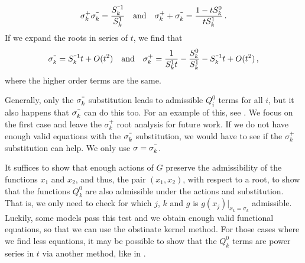\begin{align}
	\sigma_k^+ \sigma_k^{\um} = \frac{S_k^{\um 1}}{S_k^1} \qandq \sigma_k^+  + \sigma_k^{\um} = \frac{1-t S_k^0}{t S_k^1}\,.
\end{align}
If we expand the roots in series of $t$, we find that
\begin{align}
	\sigma_k^{\um} = S_k^{\um1} t + O(t^2) \qandq \sigma_k^+ = \frac{1}{S_k^1 t}-\frac{S_k^0}{S_k^1}-S_k^{\um 1} t + O(t^2)\,,
\end{align}
where the higher order terms are the same.

Generally, only the $\sigma_k^{\um}$ substitution leads to admissible $Q_i^0$ terms for all $i$, but it also happens that $\sigma_k^{\um}$ can do this too. For an example of this, see \cite[p.~11]{tabbara2014exact}. We focus on the first case and leave the $\sigma_k^{+}$ root analysis for future work. If we do not have enough valid equations with the $\sigma_k^{\um}$ substitution, we would have to see if the $\sigma_k^{+}$ substitution can help. We only use $\sigma = \sigma_k^{\um}$.

It suffices to show that enough actions of $G$ preserve the admissibility of the functions $x_1$ and $x_2$, and thus, the pair $(x_1,x_2)$, with respect to a root, to show that the functions $Q_k^0$ are also admissible under the actions and substitution. That is, we only need to check for which $j$, $k$ and $g$ is $g(x_j)|_{x_k=\sigma_k}$ admissible. Luckily, some models pass this test and we obtain enough valid functional equations, so that we can use the obstinate kernel method. For those cases where we find less equations, it may be possible to show that the $Q_k^0$ terms are power series in $t$ via another method, like in \cite{tabbara2014exact}.


